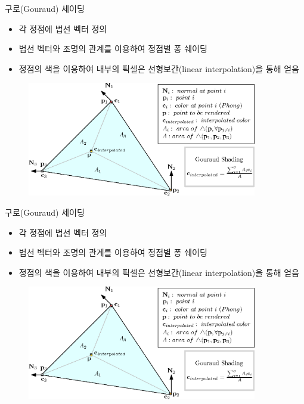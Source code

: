 \documentclass{beamer}
\begin{document}
\begin{frame}[fragile]{구로(Gouraud) 세이딩}

\begin{itemize}
\item 각 정점에 법선 벡터 정의
\item 법선 벡터와 조명의 관계를 이용하여 정점별 퐁 쉐이딩
\item 정점의 색을 이용하여 내부의 픽셀은 선형보간(linear interpolation)을 통해 얻음
\end{itemize}

\begin{figure}[h!]
  \centering
    \includegraphics[height=5cm]{OGL_light/interpolatedColors.eps}
\end{figure}
\end{frame}

\begin{frame}[fragile]{구로(Gouraud) 세이딩}

\begin{itemize}
\item 각 정점에 법선 벡터 정의
\item 법선 벡터와 조명의 관계를 이용하여 정점별 퐁 쉐이딩
\item 정점의 색을 이용하여 내부의 픽셀은 선형보간(linear interpolation)을 통해 얻음
\end{itemize}

\begin{figure}[h!]
  \centering
    \includegraphics[height=5cm]{OGL_light/interpolatedColors.eps}
\end{figure}
\end{frame}
\end{document}
